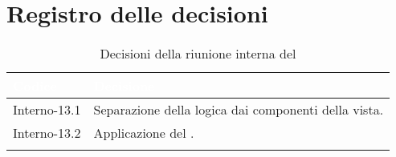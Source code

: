 \section{Registro delle decisioni}
{
\renewcommand{\arraystretch}{1.5}
\centering
\begin{longtable}{C{3cm} C{9cm}}
\textcolor{white}{\textbf{Codice}}&
\textcolor{white}{\textbf{Decisione}}\\	

\endhead
		
Interno-13.1 & Separazione della logica dai componenti della vista. \\
Interno-13.2 & Applicazione del .\\

\caption{Decisioni della riunione interna del \Data{}}
\end{longtable}
}


